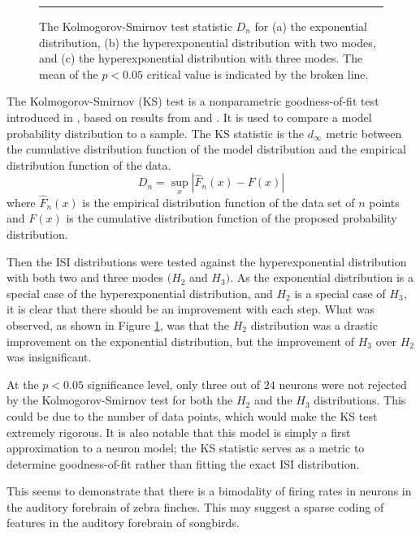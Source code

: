 \begin{figure}

\bigskip
\rule{33em}{0.5pt}
\caption{\label{exphehe3} The Kolmogorov-Smirnov test statistic $D_n$ for (a) the exponential distribution, (b) the hyperexponential distribution with two modes, and (c) the hyperexponential distribution with three modes.  The mean of the $p<0.05$ critical value is indicated by the broken line.}
\end{figure}

The Kolmogorov-Smirnov (KS) test is a nonparametric goodness-of-fit test introduced in \citep{Massey1951a}, based on results from \citet{Kolmogorov1933a} and \citet{Smirnoff1939a}.  It is used to compare a model probability distribution to a sample.  The KS statistic is the $d_{\infty}$ metric between the cumulative distribution function of the model distribution and the empirical distribution function of the data.
\begin{equation}
D_n = \sup_x \left| \hat{F}_n(x) - F(x) \right|
\end{equation}
where $\hat{F}_n(x)$ is the empirical distribution function of the data set of $n$ points and $F(x)$ is the cumulative distribution function of the proposed probability distribution.

Then the ISI distributions were tested against the hyperexponential distribution with both two and three modes $(H_2$ and $H_3)$.  As the exponential distribution is a special case of the hyperexponential distribution, and $H_2$ is a special case of $H_3$, it is clear that there should be an improvement with each step.  What was observed, as shown in Figure \ref{exphehe3}, was that the $H_2$ distribution was a drastic improvement on the exponential distribution, but the improvement of $H_3$ over $H_2$ was insignificant. 


At the $p<0.05$ significance level, only three out of $24$ neurons were not rejected by the Kolmogorov-Smirnov test for both the $H_2$ and the $H_3$ distributions. This could be due to the number of data points, which would make the KS test extremely rigorous.  It is also notable that this model is simply a first approximation to a neuron model; the KS statistic serves as a metric to determine goodness-of-fit rather than fitting the exact ISI distribution.

This seems to demonstrate that there is a bimodality of firing rates in neurons in the auditory forebrain of zebra finches.  This may suggest a sparse coding of features in the auditory forebrain of songbirds.  


